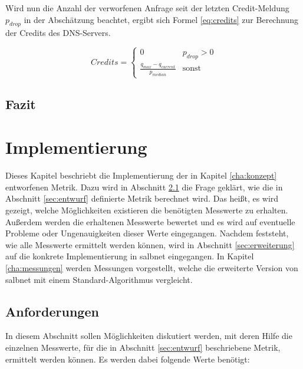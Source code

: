 \documentclass[a4paper, 12pt, BCOR10mm, DIV12, toc=bibliography, toc=listof, german]{scrbook}
\begin{document}
		Wird nun die Anzahl der verworfenen Anfrage seit der letzten Credit-Meldung $p_{drop}$
		in der Abschätzung beachtet, ergibt sich Formel \ref{eq:credits} zur Berechnung der Credits des
		DNS-Servers.

		\begin{equation}
			Credits = \begin{cases}0 & p_{drop}>0\\ \frac{\displaystyle q_{max} - q_{current}}{\displaystyle p_{median}}
			  & \text{sonst}\end{cases}
			\label{eq:credits}
		\end{equation}



		\section{Fazit} %
		\label{sec:konzept-fazit}
		


	\chapter{Implementierung} %
	\label{cha:implementierung}


	Dieses Kapitel beschriebt die Implementierung der in Kapitel \ref{cha:konzept} entworfenen Metrik.
	Dazu wird in Abschnitt \ref{sec:anforderungen} die Frage geklärt, wie die in Abschnitt
	\ref{sec:entwurf} definierte Metrik berechnet wird. Das heißt, es wird gezeigt, welche
	Möglichkeiten existieren die benötigten Messwerte zu erhalten. Außerdem werden die erhaltenen
	Messwerte bewertet und es wird auf eventuelle Probleme oder Ungenauigkeiten dieser Werte
	eingegangen. Nachdem feststeht, wie alle Messwerte ermittelt werden können, wird in Abschnitt
	\ref{sec:erweiterung} auf die konkrete Implementierung in salbnet eingegangen. In Kapitel
	\ref{cha:messungen} werden Messungen vorgestellt, welche die erweiterte Version von salbnet mit
	einem Standard-Algorithmus vergleicht.
		
		\section{Anforderungen} %
		\label{sec:anforderungen}

		In diesem Abschnitt sollen Möglichkeiten diskutiert werden, mit deren Hilfe die einzelnen
		Messwerte, für die in Abschnitt \ref{sec:entwurf} beschriebene Metrik, ermittelt werden können. Es
		werden dabei folgende Werte benötigt: $~$\\
		
\end{document}
